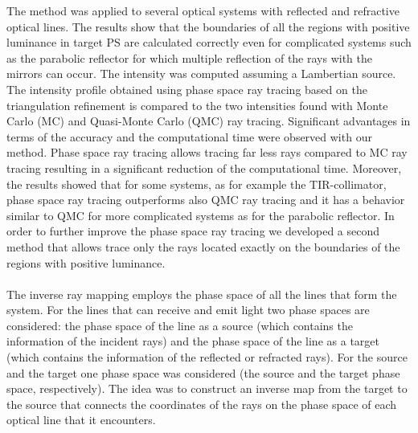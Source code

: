 The method was applied to several optical systems with reflected and refractive optical lines. The results show that the boundaries of all the regions with positive luminance in target PS are calculated correctly even for complicated systems such as the parabolic reflector for which multiple reflection of the rays with the mirrors can occur. 
The intensity was computed assuming a Lambertian source. 
The intensity profile obtained using phase space ray tracing based on the triangulation refinement is compared to the two intensities found with Monte Carlo (MC) and Quasi-Monte Carlo (QMC) ray tracing. Significant advantages in terms of the accuracy and the computational time were observed with our method. Phase space ray tracing allows tracing far less rays compared to MC ray tracing resulting in a significant reduction of the computational time. Moreover, the results showed that for some systems, as for example the TIR-collimator, phase space ray tracing outperforms also QMC ray tracing and it has a behavior similar to QMC for more complicated systems as for the parabolic reflector.
In order to further improve the phase space ray tracing we developed a second method that allows trace only the rays located exactly on the boundaries of the regions with positive luminance. 
\\ \\ \indent The inverse ray mapping employs the phase space of all the lines that form the system. For the lines that can receive and emit light two phase spaces are considered: the phase space of the line as a source (which contains the information of the incident rays) and the phase space of the line as a target (which contains the information of the reflected or refracted rays). For the source and the target one phase space was considered (the source and the target phase space, respectively). The idea was to construct an inverse map from the target to the source that connects the coordinates of the rays on the phase space of each optical line that it encounters. \\ \indent 
